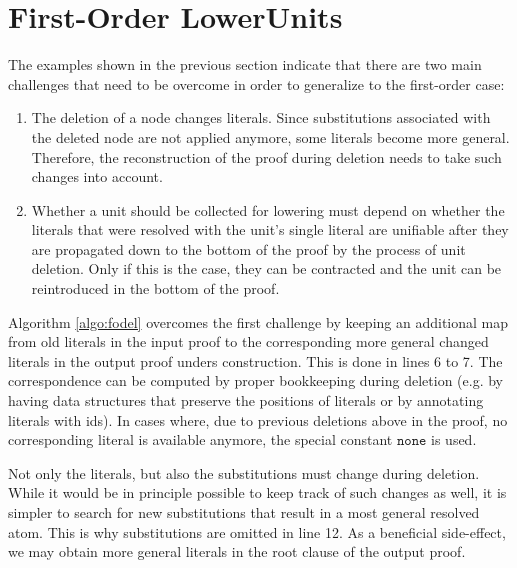 

\section{First-Order LowerUnits} \label{sec:FOLU}

The examples shown in the previous section indicate that there are two main challenges that need to be overcome in order to generalize \LowerUnits to the first-order case:
\begin{enumerate}
\item The deletion of a node changes literals. Since substitutions associated with the deleted node are not applied anymore, some literals become more general. Therefore, the reconstruction of the proof during deletion needs to take such changes into account.
\item Whether a unit should be collected for lowering must depend on whether the literals that were resolved with the unit's single literal are unifiable after they are propagated down to the bottom of the proof by the process of unit deletion. Only if this is the case, they can be contracted and the unit can be reintroduced in the bottom of the proof.
\end{enumerate}

\newcommand{\none}{\texttt{none}}

\noindent
Algorithm \ref{algo:fodel} overcomes the first challenge by keeping an additional map from old literals in the input proof to the corresponding more general changed literals in the output proof unders construction. This is done in lines 6 to 7. The correspondence can be computed by proper bookkeeping during deletion (e.g. by having data structures that preserve the positions of literals or by annotating literals with ids). In cases where, due to previous deletions above in the proof, no corresponding literal is available anymore, the special constant $\none$ is used. 

Not only the literals, but also the substitutions must change during deletion. While it would be in principle possible to keep track of such changes as well, it is simpler to search for new substitutions that result in a most general resolved atom. This is why substitutions are omitted in line 12. As a beneficial side-effect, we may obtain more general literals in the root clause of the output proof.


\clearpage



